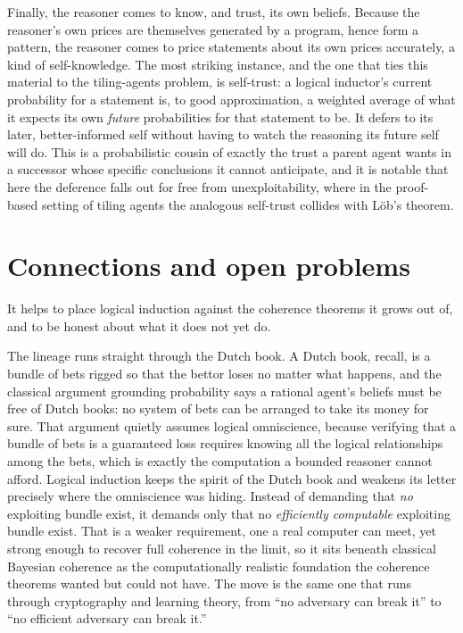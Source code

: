 \documentclass[10pt]{article}
\theoremstyle{definition}
\theoremstyle{remark}
\begin{document}
Finally, the reasoner comes to know, and trust, its own beliefs. Because the reasoner's own prices are themselves generated by a program, hence form a pattern, the reasoner comes to price statements about its own prices accurately, a kind of self-knowledge. The most striking instance, and the one that ties this material to the tiling-agents problem, is self-trust: a logical inductor's current probability for a statement is, to good approximation, a weighted average of what it expects its own \emph{future} probabilities for that statement to be. It defers to its later, better-informed self without having to watch the reasoning its future self will do. This is a probabilistic cousin of exactly the trust a parent agent wants in a successor whose specific conclusions it cannot anticipate, and it is notable that here the deference falls out for free from unexploitability, where in the proof-based setting of tiling agents the analogous self-trust collides with L\"ob's theorem.

\section{Connections and open problems}
\label{sec:connections}

It helps to place logical induction against the coherence theorems it grows out of, and to be honest about what it does not yet do.

The lineage runs straight through the Dutch book. A Dutch book, recall, is a bundle of bets rigged so that the bettor loses no matter what happens, and the classical argument grounding probability says a rational agent's beliefs must be free of Dutch books: no system of bets can be arranged to take its money for sure. That argument quietly assumes logical omniscience, because verifying that a bundle of bets is a guaranteed loss requires knowing all the logical relationships among the bets, which is exactly the computation a bounded reasoner cannot afford. Logical induction keeps the spirit of the Dutch book and weakens its letter precisely where the omniscience was hiding. Instead of demanding that \emph{no} exploiting bundle exist, it demands only that no \emph{efficiently computable} exploiting bundle exist. That is a weaker requirement, one a real computer can meet, yet strong enough to recover full coherence in the limit, so it sits beneath classical Bayesian coherence as the computationally realistic foundation the coherence theorems wanted but could not have. The move is the same one that runs through cryptography and learning theory, from ``no adversary can break it'' to ``no efficient adversary can break it.''
\end{document}
